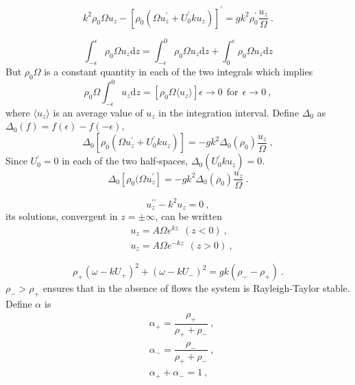 \documentclass[12pt,a4paper]{article}
\newcommand{\dif}{\mathrm{d}}
\begin{document}
\begin{equation}
k^2 \rho_0 \Omega u_z -[\rho_0 (\Omega u_z^\prime +U_0^\prime k u_z)]^\prime = gk^2 \rho_0^\prime \dfrac{u_z}{\Omega} ~.
\end{equation}

\begin{equation*}
\int_{-\epsilon}^\epsilon \rho_0 \Omega u_z \dif z = \int_{-\epsilon}^0 \rho_0 \Omega u_z \dif z +\int_{0}^\epsilon \rho_0 \Omega u_z \dif z
\end{equation*}
But $\rho_0 \Omega$ is a constant quantity in each of the two integrals which implies
\begin{equation}
 \rho_0 \Omega  \int_{-\epsilon}^0 u_z \dif z = [\rho_0 \Omega \langle u_z \rangle] \epsilon  \rightarrow 0 ~~\text{for} ~~ \epsilon  \rightarrow 0 ~,
\end{equation}
where $\langle u_z \rangle$ is an average value of $u_z$ in the integration interval. Define $\Delta_0$ as $\Delta_0(f) = f(\epsilon) - f(-\epsilon)$, 
\begin{equation*}
\Delta_0 [\rho_0 (\Omega u_z^\prime +U_0^\prime k u_z)] = -gk^2 \Delta_0(\rho_0) \dfrac{u_z}{\Omega} ~,
\end{equation*}
Since $U_0^\prime = 0$ in each of the two half-spaces, $\Delta_0 (U_0^\prime k u_z) = 0$.
\begin{equation}
\Delta_0 [\rho_0 (\Omega u_z^\prime ] = -gk^2 \Delta_0(\rho_0) \dfrac{u_z}{\Omega} ~.
\end{equation}

\begin{equation*}
u_z^{\prime\prime} -k^2 u_z = 0 ~,
\end{equation*}
its solutions, convergent in $z = \pm \infty$, can be written
\begin{align*}
& u_z = A \Omega  e^{kz} ~~ (z < 0) ~, \\
& u_z = A \Omega  e^{-kz} ~~ (z > 0) ~, 
\end{align*}

\begin{equation}
\rho_+(\omega -kU_+)^2 +(\omega -kU_-)^2 = g k(\rho_- -\rho_+) ~.
\end{equation}
$\rho_- >\rho_+$ ensures that in the absence of flows the system is Rayleigh-Taylor stable. Define $\alpha$ is
\begin{align*}
& \alpha_+ = \dfrac{\rho_+}{\rho_+  +\rho_-} ~, \\
& \alpha_- = \dfrac{\rho_-}{\rho_+  +\rho_-} ~, \\
& \alpha_+ +\alpha_- = 1 ~,
\end{align*}
\end{document}
